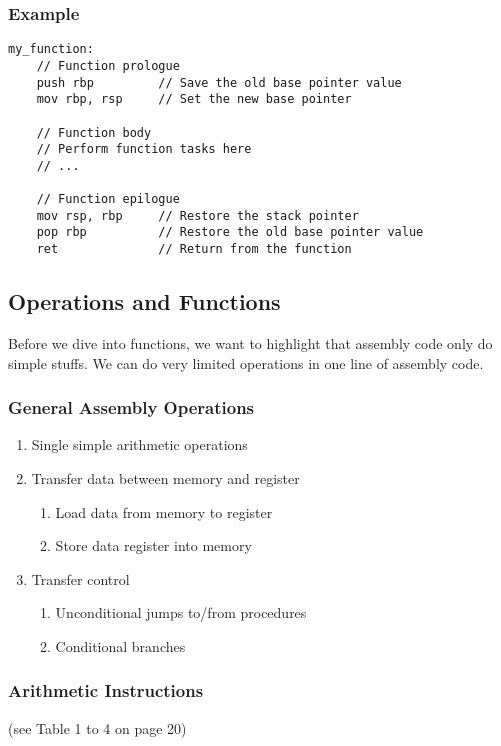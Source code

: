 \documentclass{article}
\begin{document}
\subsubsection*{Example}
\begin{verbatim}
my_function:
    // Function prologue
    push rbp         // Save the old base pointer value
    mov rbp, rsp     // Set the new base pointer

    // Function body
    // Perform function tasks here
    // ...

    // Function epilogue
    mov rsp, rbp     // Restore the stack pointer
    pop rbp          // Restore the old base pointer value
    ret              // Return from the function

\end{verbatim}


\subsection{Operations and Functions}
Before we dive into functions, we want to highlight that assembly code only do simple stuffs. We can do very limited operations in one line of assembly code.

\subsubsection*{General Assembly Operations}
\begin{enumerate}
    \item Single simple arithmetic operations
    \item Transfer data between memory and register
    \begin{enumerate}
        \item Load data from memory to register
        \item Store data register into memory
    \end{enumerate}
    \item Transfer control
    \begin{enumerate}
        \item Unconditional jumps to/from procedures
        \item Conditional branches
    \end{enumerate}
\end{enumerate}

\subsubsection{Arithmetic Instructions}
(see Table 1 to 4 on page 20)
\end{document}
